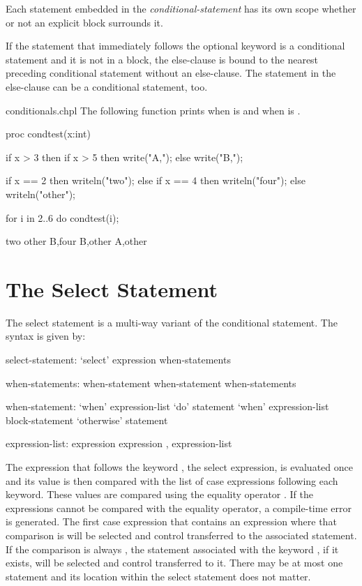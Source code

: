 Each statement embedded in the {\em conditional-statement} has its own
scope whether or not an explicit block surrounds it.

If the statement that immediately follows the optional 
keyword is a conditional statement and it is not in a block, the
else-clause is bound to the nearest preceding conditional statement
without an else-clause.
The statement in the else-clause can be a conditional statement, too.

\begin{chapelexample}{conditionals.chpl}
The following function prints  when  is 
and  when  is .
\begin{chapel}
proc condtest(x:int) {
  if x > 3 then
    if x > 5 then
      write("A,");
    else
      write("B,");

  if x == 2 then
    writeln("two");
  else if x == 4 then
    writeln("four");
  else
    writeln("other");
}
\end{chapel}
\begin{chapelpost}
for i in 2..6 do condtest(i);
\end{chapelpost}
\begin{chapeloutput}
two
other
B,four
B,other
A,other
\end{chapeloutput}
\end{chapelexample}

\section{The Select Statement}
\label{The_Select_Statement}

The select statement is a multi-way variant of the conditional
statement.  The syntax is given by:
\begin{syntax}
select-statement:
  `select' expression { when-statements }

when-statements:
  when-statement
  when-statement when-statements

when-statement:
  `when' expression-list `do' statement
  `when' expression-list block-statement
  `otherwise' statement

expression-list:
  expression
  expression , expression-list
\end{syntax}
The expression that follows the keyword , the select
expression, is evaluated once and its value is then compared
with the list of case expressions following each
 keyword. These values are compared using the equality
operator \chpl{==}.  If the expressions cannot be compared with the
equality operator, a compile-time error is generated.  The first case
expression that contains an expression where that comparison
is  will be selected and control transferred to the
associated statement.  If the comparison is always , the
statement associated with the keyword , if it exists,
will be selected and control transferred to it.  There may be at most
one  statement and its location within the select
statement does not matter.

